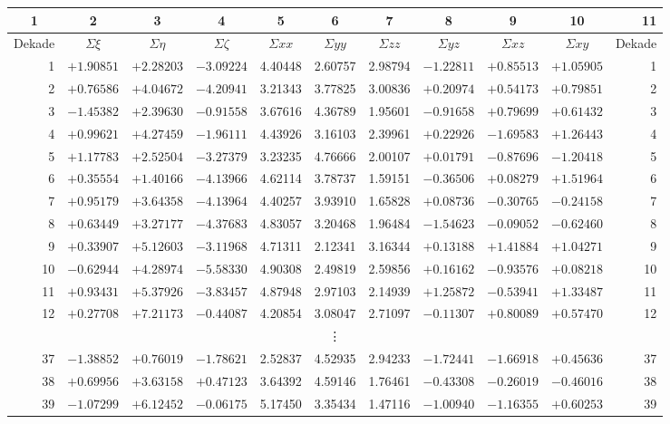 \documentclass[12pt,a4paper]{article}
\theoremstyle{plain}
\theoremstyle{definition}
\theoremstyle{remark}
\begin{document}
\begin{footnotesize}
\begin{center}
\begin{tabular}{|r|c|c|c||c|c|c|c|c|c||r|}
\hline
\multicolumn{1}{|c|}{1} & 2 & 3 & 4 & 5 & 6 & 7 & 8 & 9 & 10 & 11 \\
\hline
Dekade & $\Sigma\xi$ & $\Sigma\eta$ & $\Sigma\zeta$ &
$\Sigma xx$ & $\Sigma yy$ & $\Sigma zz$ & $\Sigma yz$ & $\Sigma xz$ & $\Sigma xy$ & Dekade \\
\hline
 1 & $+1.90851$ & $+2.28203$ & $-3.09224$ & 4.40448 & 2.60757 & 2.98794 & $-1.22811$ & $+0.85513$ & $+1.05905$ & 1 \\
 2 & $+0.76586$ & $+4.04672$ & $-4.20941$ & 3.21343 & 3.77825 & 3.00836 & $+0.20974$ & $+0.54173$ & $+0.79851$ & 2 \\
 3 & $-1.45382$ & $+2.39630$ & $-0.91558$ & 3.67616 & 4.36789 & 1.95601 & $-0.91658$ & $+0.79699$ & $+0.61432$ & 3 \\
 4 & $+0.99621$ & $+4.27459$ & $-1.96111$ & 4.43926 & 3.16103 & 2.39961 & $+0.22926$ & $-1.69583$ & $+1.26443$ & 4 \\
 5 & $+1.17783$ & $+2.52504$ & $-3.27379$ & 3.23235 & 4.76666 & 2.00107 & $+0.01791$ & $-0.87696$ & $-1.20418$ & 5 \\
 6 & $+0.35554$ & $+1.40166$ & $-4.13966$ & 4.62114 & 3.78737 & 1.59151 & $-0.36506$ & $+0.08279$ & $+1.51964$ & 6 \\
\hline
 7 & $+0.95179$ & $+3.64358$ & $-4.13964$ & 4.40257 & 3.93910 & 1.65828 & $+0.08736$ & $-0.30765$ & $-0.24158$ & 7 \\
 8 & $+0.63449$ & $+3.27177$ & $-4.37683$ & 4.83057 & 3.20468 & 1.96484 & $-1.54623$ & $-0.09052$ & $-0.62460$ & 8 \\
 9 & $+0.33907$ & $+5.12603$ & $-3.11968$ & 4.71311 & 2.12341 & 3.16344 & $+0.13188$ & $+1.41884$ & $+1.04271$ & 9 \\
10 & $-0.62944$ & $+4.28974$ & $-5.58330$ & 4.90308 & 2.49819 & 2.59856 & $+0.16162$ & $-0.93576$ & $+0.08218$ & 10 \\
11 & $+0.93431$ & $+5.37926$ & $-3.83457$ & 4.87948 & 2.97103 & 2.14939 & $+1.25872$ & $-0.53941$ & $+1.33487$ & 11 \\
12 & $+0.27708$ & $+7.21173$ & $-0.44087$ & 4.20854 & 3.08047 & 2.71097 & $-0.11307$ & $+0.80089$ & $+0.57470$ & 12 \\
\hline
\multicolumn{11}{c}{\vdots} \\
\hline
37 & $-1.38852$ & $+0.76019$ & $-1.78621$ & 2.52837 & 4.52935 & 2.94233 & $-1.72441$ & $-1.66918$ & $+0.45636$ & 37 \\
38 & $+0.69956$ & $+3.63158$ & $+0.47123$ & 3.64392 & 4.59146 & 1.76461 & $-0.43308$ & $-0.26019$ & $-0.46016$ & 38 \\
39 & $-1.07299$ & $+6.12452$ & $-0.06175$ & 5.17450 & 3.35434 & 1.47116 & $-1.00940$ & $-1.16355$ & $+0.60253$ & 39 \\
\hline
\end{tabular}
\end{center}
\end{footnotesize}
\end{document}
